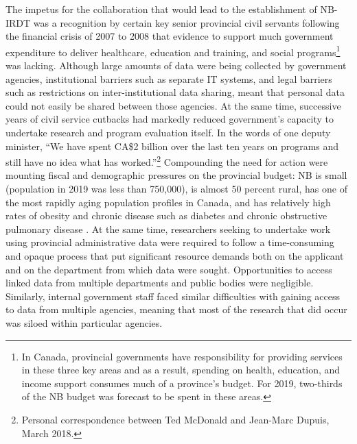 \documentclass[
]{book}
\begin{document}
The impetus for the collaboration that would lead to the establishment of NB-IRDT was a recognition by certain key senior provincial civil servants following the financial crisis of 2007 to 2008 that evidence to support much government expenditure to deliver healthcare, education and training, and social programs\footnote{In Canada, provincial governments have responsibility for providing services in these three key areas and as a result, spending on health, education, and income support consumes much of a province's budget. For 2019, two-thirds of the NB budget was forecast to be spent in these areas.} was lacking. Although large amounts of data were being collected by government agencies, institutional barriers such as separate IT systems, and legal barriers such as restrictions on inter-institutional data sharing, meant that personal data could not easily be shared between those agencies. At the same time, successive years of civil service cutbacks had markedly reduced government's capacity to undertake research and program evaluation itself. In the words of one deputy minister, ``We have spent CA\$2 billion over the last ten years on programs and still have no idea what has worked.''\footnote{Personal correspondence between Ted McDonald and Jean-Marc Dupuis, March 2018.} Compounding the need for action were mounting fiscal and demographic pressures on the provincial budget: NB is small (population in 2019 was less than 750,000), is almost 50 percent rural, has one of the most rapidly aging population profiles in Canada, and has relatively high rates of obesity and chronic disease such as diabetes and chronic obstructive pulmonary disease \citep{statisticscanada2020}. At the same time, researchers seeking to undertake work using provincial administrative data were required to follow a time-consuming and opaque process that put significant resource demands both on the applicant and on the department from which data were sought. Opportunities to access linked data from multiple departments and public bodies were negligible. Similarly, internal government staff faced similar difficulties with gaining access to data from multiple agencies, meaning that most of the research that did occur was siloed within particular agencies.
\end{document}
